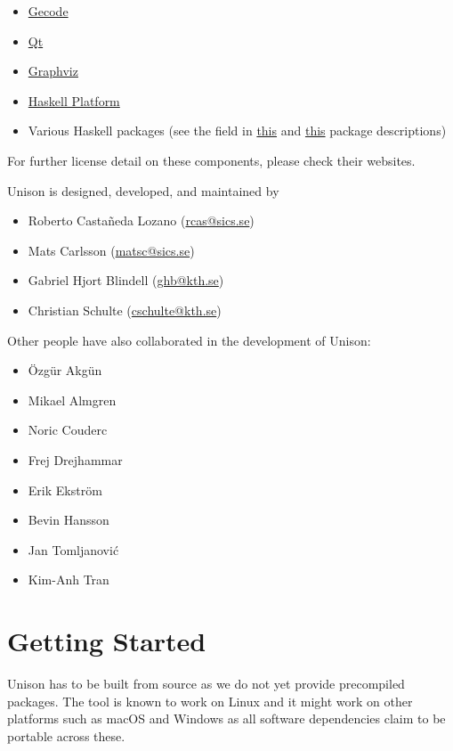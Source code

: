 \documentclass[11pt]{report}
\begin{document}
\begin{itemize}
\item \href{http://www.gecode.org/}{Gecode}
\item \href{https://www.qt.io/}{Qt}
\item \href{http://www.graphviz.org/}{Graphviz}
\item \href{https://www.haskell.org/platform/}{Haskell Platform}
\item Various Haskell packages (see the  field in
  \href{https://github.com/unison-code/unison/blob/master/src/unison/unison.cabal}{this}
  and
  \href{https://github.com/unison-code/unison/blob/master/src/unison-specsgen/unison-specsgen.cabal}{this}
  package descriptions)
\end{itemize}

For further license detail on these components, please check their websites.

Unison is designed, developed, and maintained by

\begin{itemize}
\item Roberto Castañeda Lozano (\href{mailto:rcas@sics.se}{rcas@sics.se})
\item Mats Carlsson (\href{mailto:matsc@sics.se}{matsc@sics.se})
\item Gabriel Hjort Blindell (\href{mailto:ghb@kth.se}{ghb@kth.se})
\item Christian Schulte (\href{mailto:cschulte@kth.se}{cschulte@kth.se})
\end{itemize}

Other people have also collaborated in the development of Unison:
%
\begin{itemize}
\item Özgür Akgün
\item Mikael Almgren
\item Noric Couderc
\item Frej Drejhammar
\item Erik Ekström
\item Bevin Hansson
\item Jan Tomljanović
\item Kim-Anh Tran
\end{itemize}

\chapter{Getting Started}%
\label{sec:getting-started}

Unison has to be built from source as we do not yet provide precompiled
packages.
%
The tool is known to work on Linux and it might work on other platforms such as
macOS and Windows as all software dependencies claim to be portable across
these.
\end{document}
